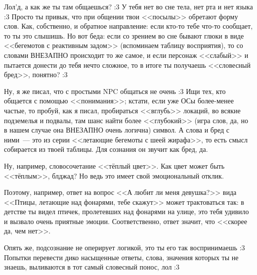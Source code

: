 \documentclass[a4paper,14pt,oneside]{memoir}
\begin{document}
\medskip

Лол'д, а как же ты там общаешься? :3 У тебя нет во сне тела, нет рта и нет языка :3 Просто ты привык, что при общении твои <<посылы>> обретают форму слов. Как, собственно, и обратное направление: если кто-то тебе что-то сообщает, то ты это слышишь. Но вот беда: если со зрением во сне бывают глюки в виде <<бегемотов с реактивным задом>> (вспоминаем таблицу восприятия), то со словами ВНЕЗАПНО происходит то же самое, и если персонаж <<слабый>> и пытается донести до тебя нечто сложное, то в итоге ты получаешь <<словесный бред>>, понятно? :3 


\medskip

Ну, я же писал, что с простыми NPC общаться не очень :3 Ищи тех, кто общается с помощью <<понимания>>; кстати, если уже ОСы более-менее частые, то пробуй, как я писал, пробираться <<вглубь>> локаций, во всякие подземелья и подвалы, там шанс найти более <<глубокий>> (игра слов, да, но в нашем случае она ВНЕЗАПНО очень логична) символ. А слова и бред с ними~--- это из серии <<летающие бегемоты с шеей жирафа>>, то есть смысл собирается из твоей таблицы. Для сознания он звучит как бред, да.
 
Ну, например, словосочетание <<тёплый цвет>>. Как цвет может быть <<тёплым>>, блджад? Но ведь это имеет свой эмоциональный отклик.
 
Поэтому, например, ответ на вопрос <<А любит ли меня девушка?>> вида <<Птицы, летающие над фонарями, тебе скажут>> может трактоваться так: в детстве ты видел птичек, пролетевших над фонарями на улице, это тебя удивило и вызвало очень приятные эмоции. Соответственно, ответ значит, что <<скорее да, чем нет>>. 

Опять же, подсознание не оперирует логикой, это ты его так воспринимаешь :3 Попытки перевести дико насыщенные ответы, слова, значения которых ты не знаешь, выливаются в тот самый словесный понос, лол :3 
\end{document}
